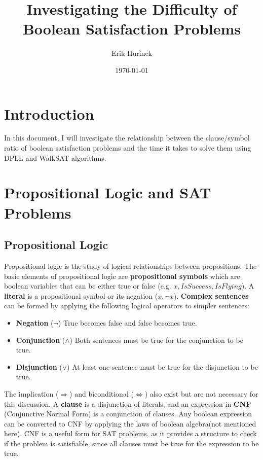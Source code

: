 \documentclass{article}
\author{Erik Hurinek}
\title{Investigating the Difficulty of Boolean Satisfaction Problems}
\date{\today}
\begin{document}
    \maketitle
    
    \section{Introduction}

    In this document, I will investigate the relationship between the clause/symbol ratio of boolean satisfaction problems and the time it takes to solve them using DPLL and WalkSAT algorithms.

    \section{Propositional Logic and SAT Problems}

    \subsection{Propositional Logic}
    Propositional logic is the study of logical relationships between propositions.\supercite{sep-logic-propositional} The basic elements of propositional logic are \textbf{propositional symbols} which are boolean variables that can be either true or false (e.g. \(x, IsSuccess, IsFlying\)). A \textbf{literal} is a propositional symbol or its negation (\(x, \neg x \)). \textbf{Complex sentences} can be formed by applying the following logical operators to simpler sentences:  

    \begin{itemize}
        \item \textbf{Negation} ($\neg$) True becomes false and false becomes true.
        \item \textbf{Conjunction} ($\land$) Both sentences must be true for the conjunction to be true.
        \item \textbf{Disjunction} ($\lor$) At least one sentence must be true for the disjunction to be true.
    \end{itemize}

    The implication ($\Rightarrow$) and biconditional ($\Leftrightarrow$) also exist but are not necessary for this discussion. A \textbf{clause} is a disjunction of literals, and an expression in \textbf{CNF} (Conjunctive Normal Form) is a conjunction of clauses. Any boolean expression can be converted to CNF by applying the laws of boolean algebra\supercite{Norvig_2021}(not mentioned here). CNF is a useful form for SAT problems, as it provides a structure to check if the problem is satisfiable, since all clauses must be true for the expression to be true.
\end{document}

